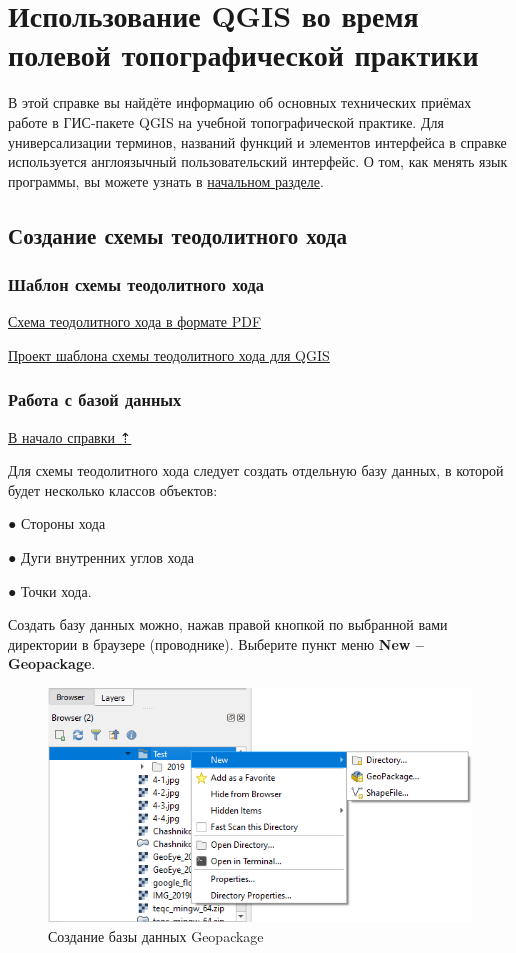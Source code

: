 \documentclass[
  12pt,
]{book}
\begin{document}
\chapter{Использование QGIS во время полевой топографической практики}\label{practice}

В этой справке вы найдёте информацию об основных технических приёмах работе в ГИС-пакете QGIS на учебной топографической практике. Для универсализации терминов, названий функций и элементов интерфейса в справке используется англоязычный пользовательский интерфейс. О том, как менять язык программы, вы можете узнать в \href{https://iowq750.github.io/Topography/\#global}{начальном разделе}.

\section{Создание схемы теодолитного хода}\label{practice-theod}

\subsection{Шаблон схемы теодолитного хода}\label{practice-theod-template}

\href{https://disk.yandex.ru/i/Z3H_BOK2KYfDRQ}{Схема теодолитного хода в формате PDF}

\href{https://disk.yandex.ru/d/JcXRhKuiqoVTLg}{Проект шаблона схемы теодолитного хода для QGIS}

\subsection{Работа с базой данных}\label{practice-theod-DB}

\hyperref[practice-theod]{В начало справки ⇡}

Для схемы теодолитного хода следует создать отдельную базу данных, в которой будет несколько классов объектов:

● Стороны хода

● Дуги внутренних углов хода

● Точки хода.

Создать базу данных можно, нажав правой кнопкой по выбранной вами директории в браузере (проводнике). Выберите пункт меню \textbf{New -- Geopackage}.

\begin{figure}
\centering
\includegraphics{images/Practice/Create_DB.png}
\caption{Создание базы данных Geopackage}
\end{figure}
\end{document}
